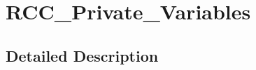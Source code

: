 \hypertarget{group___r_c_c___private___variables}{}\section{R\+C\+C\+\_\+\+Private\+\_\+\+Variables}
\label{group___r_c_c___private___variables}


\subsection{Detailed Description}
